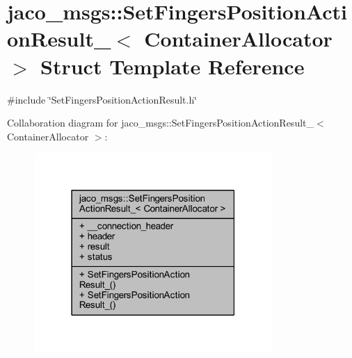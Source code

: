 \hypertarget{structjaco__msgs_1_1SetFingersPositionActionResult__}{}\section{jaco\+\_\+msgs\+:\+:Set\+Fingers\+Position\+Action\+Result\+\_\+$<$ Container\+Allocator $>$ Struct Template Reference}
\label{structjaco__msgs_1_1SetFingersPositionActionResult__}


{\ttfamily \#include \char`\"{}Set\+Fingers\+Position\+Action\+Result.\+h\char`\"{}}



Collaboration diagram for jaco\+\_\+msgs\+:\+:Set\+Fingers\+Position\+Action\+Result\+\_\+$<$ Container\+Allocator $>$\+:
\nopagebreak
\begin{figure}[H]
\begin{center}
\leavevmode
\includegraphics[width=255pt]{d8/d32/structjaco__msgs_1_1SetFingersPositionActionResult____coll__graph}
\end{center}
\end{figure}
